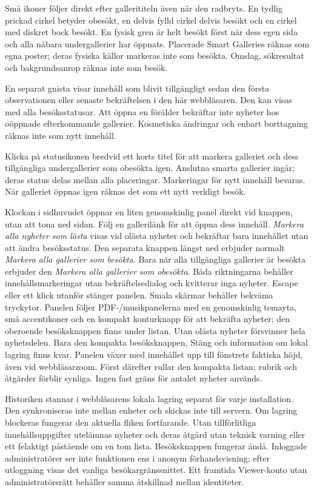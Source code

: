 \documentclass[11pt,a4paper]{article}
\begin{document}
Små ikoner följer direkt efter gallerititeln även när den radbryts. En tydlig
prickad
cirkel betyder obesökt, en delvis fylld cirkel delvis besökt och en cirkel med
diskret bock besökt. En fysisk gren är helt besökt först när dess egen sida och
alla
nåbara undergallerier har öppnats. Placerade Smart Galleries räknas som egna
poster; deras fysiska källor markeras inte som besökta. Omslag, sökresultat och
bakgrundsanrop räknas inte som besök.

En separat gnista visar innehåll som blivit tillgängligt sedan den första
observationen eller senaste bekräftelsen i den här webbläsaren. Den kan visas
med alla besöksstatusar. Att öppna en förälder bekräftar inte nyheter hos
oöppnade efterkommande gallerier. Kosmetiska ändringar och enbart borttagning
räknas inte som nytt innehåll.

Klicka på statusikonen bredvid ett korts titel för att markera galleriet och
dess tillgängliga undergallerier som obesökta igen. Anslutna smarta gallerier
ingår; deras status delas mellan alla placeringar. Markeringar för nytt innehåll
bevaras. När galleriet öppnas igen räknas det som ett nytt verkligt besök.

Klockan i sidhuvudet öppnar en liten genomskinlig panel direkt vid knappen,
utan att tona ned sidan. Följ en gallerilänk för att öppna dess innehåll.
\emph{Markera alla nyheter som lästa} visas vid olästa nyheter och bekräftar
bara innehållet utan att ändra besöksstatus. Den separata knappen längst ned
erbjuder normalt \emph{Markera alla gallerier som besökta}. Bara när alla
tillgängliga gallerier är besökta erbjuder den
\emph{Markera alla gallerier som obesökta}. Båda riktningarna behåller
innehållsmarkeringar utan bekräftelsedialog och kvitterar inga nyheter.
Escape eller ett klick utanför
stänger panelen. Smala skärmar behåller bekväma tryckytor. Panelen följer
PDF-/musikpanelerna med en genomskinlig temayta, små accentikoner och en kompakt
konturknapp för att bekräfta nyheter; den oberoende besöksknappen finns under
listan.
Utan olästa nyheter försvinner hela nyhetsdelen. Bara den kompakta
besöksknappen,
Stäng och information om lokal lagring finns kvar.
Panelen växer med innehållet upp till fönstrets faktiska höjd, även vid
webbläsarzoom. Först därefter rullar den kompakta listan; rubrik och åtgärder
förblir synliga. Ingen fast gräns för antalet nyheter används.

Historiken stannar i webbläsarens lokala lagring separat för varje installation.
Den synkroniseras inte mellan enheter och skickas inte till servern. Om lagring
blockeras fungerar den aktuella fliken fortfarande. Utan tillförlitliga
innehållsuppgifter utelämnas nyheter och deras åtgärd utan teknisk varning
eller ett felaktigt påstående om en tom lista. Besöksknappen fungerar ändå.
Inloggade administratörer
ser inte funktionen ens i anonym förhandsvisning; efter utloggning visas det
vanliga besökargränssnittet. Ett framtida Viewer-konto utan administratörsrätt
behåller samma åtskillnad mellan identiteter.
\end{document}
